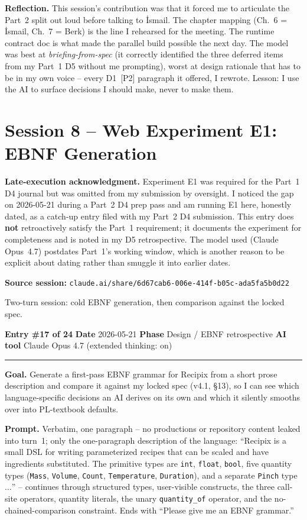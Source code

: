 \documentclass[11pt,a4paper]{article}
\newcommand{\entryheader}[4]{%
    \par\vspace{1em}\noindent\textbf{Entry \#{#1}} \textbullet{} \textbf{Date} #2 \textbullet{} \textbf{Phase} #3 \textbullet{} \textbf{AI tool} #4 \par\vspace{0.3em}\noindent\rule{\textwidth}{0.4pt}\par\vspace{0.3em}}
\newcommand{\sessionheader}[1]{%
    \par\vspace{1.5em}\noindent\textbf{Source session: }\texttt{#1}\par\vspace{0.5em}}
\newcommand{\field}[1]{\noindent\textbf{#1}}
\begin{document}
\field{Reflection.} This session's contribution was that it forced me
to articulate the Part~2 split out loud before talking to İsmail. The
chapter mapping (Ch.~6 = İsmail, Ch.~7 = Berk) is the line I rehearsed
for the meeting. The runtime contract doc is what made the parallel
build possible the next day. The model was best at
\emph{briefing-from-spec} (it correctly identified the three deferred
items from my Part~1 D5 without me prompting), worst at design
rationale that has to be in my own voice -- every D1~[P2] paragraph
it offered, I rewrote. Lesson: I use the AI to surface decisions I
should make, never to make them.


\section{Session 8 -- Web Experiment E1: EBNF Generation}

\begin{tcolorbox}[colback=ackcolor!8,colframe=ackcolor!50,boxrule=0.5pt]
\small\textbf{Late-execution acknowledgment.} Experiment E1 was
required for the Part~1 D4 journal but was omitted from my
submission by oversight. I noticed the gap on 2026-05-21 during a
Part~2 D4 prep pass and am running E1 here, honestly dated, as a
catch-up entry filed with my Part~2 D4 submission. This entry does
\textbf{not} retroactively satisfy the Part~1 requirement; it
documents the experiment for completeness and is noted in my D5
retrospective. The model used (Claude Opus~4.7) postdates Part~1's
working window, which is another reason to be explicit about
dating rather than smuggle it into earlier dates.
\end{tcolorbox}

\sessionheader{claude.ai/share/6d67cab6-006e-414f-b05c-ada5fa5b0d22}

Two-turn session: cold EBNF generation, then comparison against the
locked spec.

\entryheader{17 of 24}{2026-05-21}{Design / EBNF retrospective}{Claude Opus 4.7 (extended thinking: on)}

\field{Goal.} Generate a first-pass EBNF grammar for Recipix from a
short prose description and compare it against my locked spec
(v4.1, \S13), so I can see which language-specific decisions an AI
derives on its own and which it silently smooths over into PL-textbook
defaults.

\field{Prompt.} Verbatim, one paragraph -- no productions or repository
content leaked into turn~1; only the one-paragraph description of the
language: ``Recipix is a small DSL for writing parameterized recipes
that can be scaled and have ingredients substituted. The primitive
types are \texttt{int}, \texttt{float}, \texttt{bool}, five quantity
types (\texttt{Mass}, \texttt{Volume}, \texttt{Count},
\texttt{Temperature}, \texttt{Duration}), and a separate \texttt{Pinch}
type$\dots$'' -- continues through structured types, user-visible
constructs, the three call-site operators, quantity literals, the
unary \texttt{quantity\_of} operator, and the no-chained-comparison
constraint. Ends with ``Please give me an EBNF grammar.''
\end{document}
